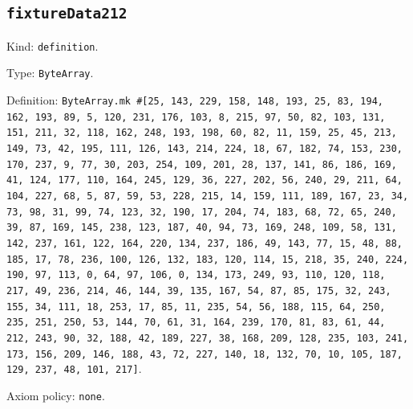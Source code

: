 \documentclass[11pt]{article}
\begin{document}
\subsection*{\texttt{fixtureData212}}
\noindent Kind: \texttt{definition}.\par
\noindent Type: \texttt{ByteArray}.\par
\noindent Definition: \texttt{ByteArray.mk \#[25, 143, 229, 158, 148, 193, 25, 83, 194, 162, 193, 89, 5, 120, 231, 176, 103, 8, 215, 97, 50, 82, 103, 131, 151, 211, 32, 118, 162, 248, 193, 198, 60, 82, 11, 159, 25, 45, 213, 149, 73, 42, 195, 111, 126, 143, 214, 224, 18, 67, 182, 74, 153, 230, 170, 237, 9, 77, 30, 203, 254, 109, 201, 28, 137, 141, 86, 186, 169, 41, 124, 177, 110, 164, 245, 129, 36, 227, 202, 56, 240, 29, 211, 64, 104, 227, 68, 5, 87, 59, 53, 228, 215, 14, 159, 111, 189, 167, 23, 34, 73, 98, 31, 99, 74, 123, 32, 190, 17, 204, 74, 183, 68, 72, 65, 240, 39, 87, 169, 145, 238, 123, 187, 40, 94, 73, 169, 248, 109, 58, 131, 142, 237, 161, 122, 164, 220, 134, 237, 186, 49, 143, 77, 15, 48, 88, 185, 17, 78, 236, 100, 126, 132, 183, 120, 114, 15, 218, 35, 240, 224, 190, 97, 113, 0, 64, 97, 106, 0, 134, 173, 249, 93, 110, 120, 118, 217, 49, 236, 214, 46, 144, 39, 135, 167, 54, 87, 85, 175, 32, 243, 155, 34, 111, 18, 253, 17, 85, 11, 235, 54, 56, 188, 115, 64, 250, 235, 251, 250, 53, 144, 70, 61, 31, 164, 239, 170, 81, 83, 61, 44, 212, 243, 90, 32, 188, 42, 189, 227, 38, 168, 209, 128, 235, 103, 241, 173, 156, 209, 146, 188, 43, 72, 227, 140, 18, 132, 70, 10, 105, 187, 129, 237, 48, 101, 217]}.\par
\noindent Axiom policy: \texttt{none}.\par
\end{document}
